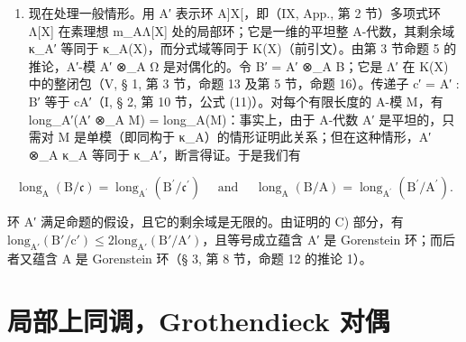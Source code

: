 \begin{enumerate}
\def\labelenumi{\Alph{enumi})}
\setcounter{enumi}{3}
\tightlist
\item
  现在处理一般情形。用 A′ 表示环 A{]}X{[}，即（IX, App., 第 2 节）多项式环 Λ{[}X{]} 在素理想 m\_AΛ{[}X{]} 处的局部环；它是一维的平坦整 A-代数，其剩余域 κ\_A′ 等同于 κ\_A(X)，而分式域等同于 K(X)（前引文）。由第 3 节命题 5 的推论，A′-模 A′ ⊗\_A Ω 是对偶化的。令 B′ = A′ ⊗\_A B；它是 Λ′ 在 K(X) 中的整闭包（V, § 1, 第 3 节，命题 13 及第 5 节，命题 16）。传递子 c′ = A′ : B′ 等于 cA′（I, § 2, 第 10 节，公式 (11)）。对每个有限长度的 A-模 M，有 long\_A′(A′ ⊗\_A M) = long\_A(M)：事实上，由于 A-代数 A′ 是平坦的，只需对 M 是单模（即同构于 κ\_A）的情形证明此关系；但在这种情形，A′ ⊗\_A κ\_A 等同于 κ\_A′，断言得证。于是我们有
\end{enumerate}

\[
\operatorname{long} _ {\mathrm{A}} (\mathrm{B} / \mathfrak {c}) = \operatorname{long} _ {\mathrm{A} ^ {\prime}} \left(\mathrm{B} ^ {\prime} / \mathfrak {c} ^ {\prime}\right) \quad \text { and } \quad \operatorname{long} _ {\mathrm{A}} (\mathrm{B} / \mathrm{A}) = \operatorname{long} _ {\mathrm{A} ^ {\prime}} \left(\mathrm{B} ^ {\prime} / \mathrm{A} ^ {\prime}\right).
\]

环 A′ 满足命题的假设，且它的剩余域是无限的。由证明的 C) 部分，有 \(\text{long}_{\text{A}'}(\text{B}'/\text{c}') \leqslant 2 \text{long}_{\text{A}'}(\text{B}'/\text{A}')\)，且等号成立蕴含 A′ 是 Gorenstein 环；而后者又蕴含 A 是 Gorenstein 环（§ 3, 第 8 节，命题 12 的推论 1）。

\section{局部上同调，Grothendieck 对偶}
